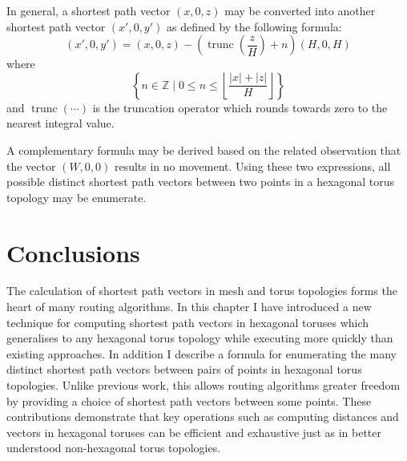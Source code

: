 			In general, a shortest path vector $(x, 0, z)$ may be converted into
			another shortest path vector $(x', 0, y')$ as defined by the following
			formula:
			\begin{equation*}
				(x', 0, y') = (x, 0, z) - \left(\operatorname{trunc}\left(\frac{z}{H}\right) + n\right)(H, 0, H)
			\end{equation*}
			where
			\begin{equation*}
				\left\{
					n \in \mathbb{Z}
				\;\Big|\;
					0 \le n \le
						\left\lfloor
							\frac{\left|x\right| + \left|z\right|}{H}
						\right\rfloor
				\right\}
			\end{equation*}
			and $\operatorname{trunc}(\cdots)$ is the truncation operator which
			rounds towards zero to the nearest integral value.
			
			A complementary formula may be derived based on the related observation
			that the vector $(W, 0, 0)$ results in no movement. Using these two
			expressions, all possible distinct shortest path vectors between two
			points in a hexagonal torus topology may be enumerate.
	
	\section{Conclusions}
		
		The calculation of shortest path vectors in mesh and torus topologies forms
		the heart of many routing algorithms. In this chapter I have introduced a
		new technique for computing shortest path vectors in hexagonal toruses
		which generalises to any hexagonal torus topology while executing more
		quickly than existing approaches. In addition I describe a formula for
		enumerating the many distinct shortest path vectors between pairs of points
		in hexagonal torus topologies. Unlike previous work, this allows routing
		algorithms greater freedom by providing a choice of shortest path vectors
		between some points. These contributions demonstrate that key operations
		such as computing distances and vectors in hexagonal toruses can be
		efficient and exhaustive just as in better understood non-hexagonal torus
		topologies.

